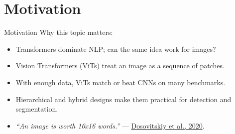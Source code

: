 \section{Motivation}
\begin{frame}{Motivation}
    \large Why this topic matters:
        \begin{itemize}
            \item Transformers dominate NLP; can the same idea work for images?
            \item Vision Transformers (ViTs) treat an image as a sequence of patches.
            \item With enough data, ViTs match or beat CNNs on many benchmarks.
            \item Hierarchical and hybrid designs make them practical for detection and segmentation.
            \item \textit{``An image is worth 16x16 words.''} --- \href{https://arxiv.org/abs/2010.11929}{Dosovitskiy et al., 2020}.
        \end{itemize}
\end{frame}
